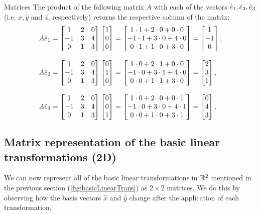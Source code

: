 \begin{example}{Matrices}{}
	The product of the following matrix $A$ with each of the vectors $\hat{e}_{1},\hat{e}_{2},\hat{e}_{3}$ (i.e. $\hat{x},\hat{y}$ and $\hat{z}$, respectively) returns the respective column of the matrix:
	\begin{align*}
		A\eb{1}=
		\begin{bmatrix}
			 1 & 2 & 0\\
			-1 & 3 & 4\\
			 0 & 1 & 3\\
		 \end{bmatrix}\colvec{1;0;0} &= \colvec{1\cdot1+2\cdot0+0\cdot0;-1\cdot1+3\cdot0+4\cdot0;0\cdot1+1\cdot0+3\cdot0} = \colvec{1;-1;0},\\[3mm]
		A\eb{2}=
		\begin{bmatrix}
			 1 & 2 & 0\\
			-1 & 3 & 4\\
			 0 & 1 & 3\\
		\end{bmatrix}\colvec{0;1;0} &= \colvec{1\cdot0+2\cdot1+0\cdot0;-1\cdot0+3\cdot1+4\cdot0;0\cdot0+1\cdot1+3\cdot0} = \colvec{2;3;1},\\[3mm]
		A\eb{3}=
		\begin{bmatrix}
			 1 & 2 & 0\\
			-1 & 3 & 4\\
			 0 & 1 & 3\\
		\end{bmatrix}\colvec{0;0;1} &= \colvec{1\cdot0+2\cdot0+0\cdot1;-1\cdot0+3\cdot0+4\cdot1;0\cdot0+1\cdot0+3\cdot1} = \colvec{0;4;3}.
	\end{align*}
\end{example}

\subsection{Matrix representation of the basic linear transformations (2D)}
We can now represent all of the basic linear transformations in $\mathbb{R}^{2}$ mentioned in the previous section (\autoref{fig:basicLinearTrans}) as $2\times2$ matrices. We do this by observing how the basis vectors $\hat{x}$ and $\hat{y}$ change after the application of each transformation.

